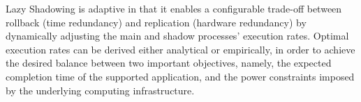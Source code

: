 Lazy Shadowing is adaptive in that it enables a configurable trade-off between rollback (time redundancy) and replication (hardware redundancy) by dynamically adjusting the main and shadow processes' execution rates.
Optimal execution rates can be derived either analytical or empirically, in order to achieve the desired balance between two important objectives, namely, the expected completion time of the supported application, and the power constraints imposed by the underlying computing infrastructure. 


